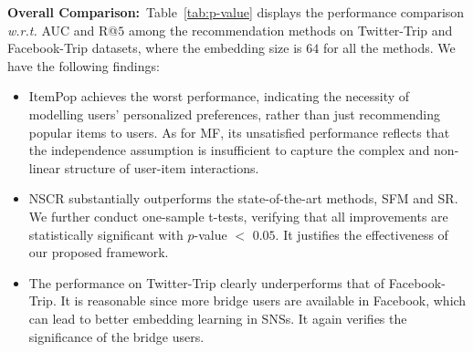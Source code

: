 \documentclass[sigconf]{acmart}
\newcommand{\wrt}{\emph{w.r.t. }}
\begin{document}
	\begin{figure*}[h]
		\centering
{}
		\vspace{-10pt}
		\caption{Performance comparison of AUC and R@$5$ \wrt the embedding size on Twitter-Trip and Facebook-Trip datasets.}
		\vspace{-1em}
		\label{fig:performance-attribute}
	\end{figure*}
	
	\textbf{Overall Comparison:}~Table~\ref{tab:p-value} displays the performance comparison \wrt AUC and R@$5$ among the recommendation methods on Twitter-Trip and Facebook-Trip datasets, where the embedding size is $64$ for all the methods. We have the following findings:
	\begin{itemize}[leftmargin=*]
		\item ItemPop achieves the worst performance, indicating the necessity of modelling users' personalized preferences, rather than just recommending popular items to users. As for MF, its unsatisfied performance reflects that the independence assumption is insufficient to capture the complex and non-linear structure of user-item interactions.
		\item NSCR substantially outperforms the state-of-the-art methods, SFM and SR. We further conduct one-sample t-tests, verifying that all improvements are statistically significant with $p$-value $<$ $0.05$. It justifies the effectiveness of our proposed framework.
		\item The performance on Twitter-Trip clearly underperforms that of Facebook-Trip. It is reasonable since more bridge users are available in Facebook, which can lead to better embedding learning in SNSs. It again verifies the significance of the bridge users.
	\end{itemize}
	
\end{document}
